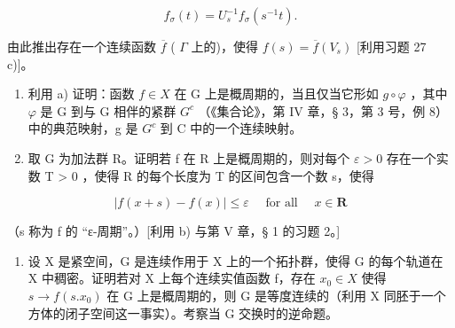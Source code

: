 \[
f _ {\sigma} (t) = U _ {s} ^ {- 1} f _ {\sigma} (s ^ {- 1} t).
\]

由此推出存在一个连续函数 \(\overline{f}\) ( \(\Gamma\) 上的)，使得 \(f(s) = \overline{f}(V_s)\) {[}利用习题 27 c){]}。

\begin{enumerate}
\def\labelenumi{\alph{enumi})}
\setcounter{enumi}{1}
\tightlist
\item
  利用 a) 证明：函数 \(f \in X\) 在 G 上是概周期的，当且仅当它形如 \(g \circ \varphi\) ，其中 \(\varphi\) 是 G 到与 G 相伴的紧群 \(G^{c}\) （《集合论》，第 IV 章，§ 3，第 3 号，例 8）中的典范映射，g 是 \(G^{c}\) 到 C 中的一个连续映射。
\item
  取 G 为加法群 R。证明若 f 在 R 上是概周期的，则对每个 \(\varepsilon > 0\) 存在一个实数 T \textgreater{} 0 ，使得 R 的每个长度为 T 的区间包含一个数 s，使得
\end{enumerate}

\[
\left| f (x + s) - f (x) \right| \leqslant \varepsilon \quad \text { for   all } \quad x \in \mathbf {R}
\]

（s 称为 f 的 “ε-周期”。）{[}利用 b) 与第 V 章，§ 1 的习题 2。{]}

\begin{enumerate}
\def\labelenumi{\arabic{enumi})}
\setcounter{enumi}{28}
\tightlist
\item
  设 X 是紧空间，G 是连续作用于 X 上的一个拓扑群，使得 G 的每个轨道在 X 中稠密。证明若对 X 上每个连续实值函数 f，存在 \(x_{0} \in X\) 使得 \(s \to f(s.x_{0})\) 在 G 上是概周期的，则 G 是等度连续的（利用 X 同胚于一个方体的闭子空间这一事实）。考察当 G 交换时的逆命题。
\end{enumerate}
